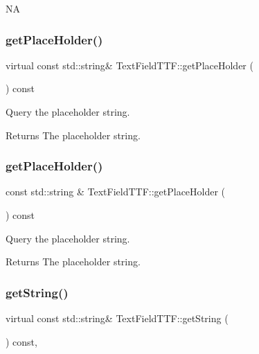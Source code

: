 NA \mbox{\label{classTextFieldTTF_a0cf968465bc0919d829bef4740bcfc64}} 
\subsubsection{\texorpdfstring{get\+Place\+Holder()}{getPlaceHolder()}\hspace{0.1cm}{\footnotesize\ttfamily [1/2]}}
{\footnotesize\ttfamily virtual const std\+::string\& Text\+Field\+T\+T\+F\+::get\+Place\+Holder (\begin{DoxyParamCaption}{ }\end{DoxyParamCaption}) const\hspace{0.3cm}{\ttfamily [virtual]}}

Query the placeholder string. \begin{DoxyReturn}{Returns}
The placeholder string. 
\end{DoxyReturn}
\mbox{\label{classTextFieldTTF_a92642716c8e8e2049f799b0f90835da4}} 
\subsubsection{\texorpdfstring{get\+Place\+Holder()}{getPlaceHolder()}\hspace{0.1cm}{\footnotesize\ttfamily [2/2]}}
{\footnotesize\ttfamily const std\+::string \& Text\+Field\+T\+T\+F\+::get\+Place\+Holder (\begin{DoxyParamCaption}{ }\end{DoxyParamCaption}) const\hspace{0.3cm}{\ttfamily [virtual]}}

Query the placeholder string. \begin{DoxyReturn}{Returns}
The placeholder string. 
\end{DoxyReturn}
\mbox{\label{classTextFieldTTF_a078bee267d229540d0940ef7f1413240}} 
\subsubsection{\texorpdfstring{get\+String()}{getString()}\hspace{0.1cm}{\footnotesize\ttfamily [1/2]}}
{\footnotesize\ttfamily virtual const std\+::string\& Text\+Field\+T\+T\+F\+::get\+String (\begin{DoxyParamCaption}{ }\end{DoxyParamCaption}) const\hspace{0.3cm}{\ttfamily [override]}, {\ttfamily [virtual]}}

